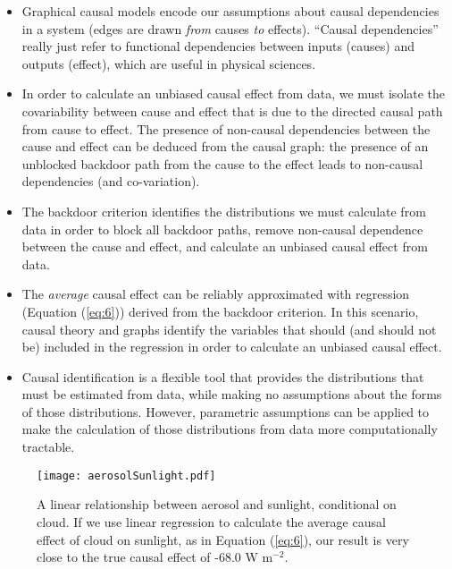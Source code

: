 \documentclass[12pt]{article}
\begin{document}
\begin{itemize}
\item Graphical causal models encode our assumptions about causal
  dependencies in a system (edges are drawn \emph{from} causes
  \emph{to} effects). ``Causal dependencies'' really just refer to
  functional dependencies between inputs (causes) and outputs
  (effect), which are useful in physical sciences.
\item In order to calculate an unbiased causal effect from data, we
  must isolate the covariability between cause and effect that is due
  to the directed causal path from cause to effect. The presence of
  non-causal dependencies between the cause and effect can be deduced
  from the causal graph: the presence of an unblocked backdoor path
  from the cause to the effect leads to non-causal dependencies (and
  co-variation).
\item The backdoor criterion identifies the distributions we must
  calculate from data in order to block all backdoor paths, remove
  non-causal dependence between the cause and effect, and calculate an
  unbiased causal effect from data.
\item The \emph{average} causal effect can be reliably approximated
  with regression (Equation (\ref{eq:6})) derived from the backdoor
  criterion. In this scenario, causal theory and graphs identify the
  variables that should (and should not be) included in the regression
  in order to calculate an unbiased causal effect.
\item Causal identification is a flexible tool that provides the
  distributions that must be estimated from data, while making no
  assumptions about the forms of those distributions. However,
  parametric assumptions can be applied to make the calculation of
  those distributions from data more computationally tractable.
\end{itemize}

\begin{figure}
  \texttt{[image: aerosolSunlight.pdf]}
  \caption{A linear relationship between aerosol and sunlight,
    conditional on cloud. If we use linear regression to calculate the
    average causal effect of cloud on sunlight, as in Equation
    (\ref{eq:6}), our result is very close to the true causal effect
    of -68.0 W m$^{-2}$.}
  \label{fig:linear}
\end{figure}
\end{document}
